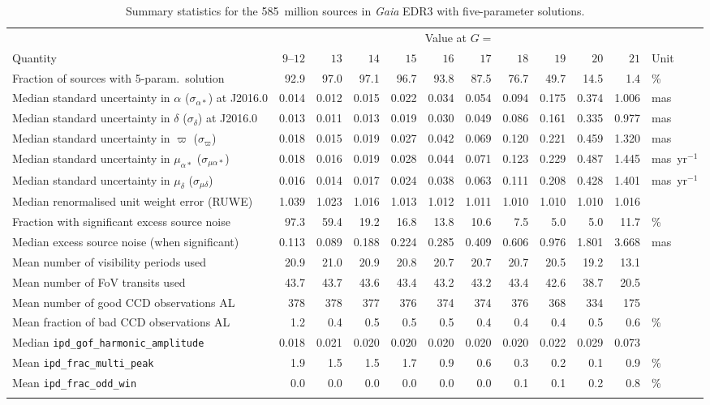 \documentclass[longauth]{aa} %
\newcommand{\gacs}[1]{{\footnotesize\texttt{#1}}}
\begin{document}
\begin{table}[t]
\caption{Summary statistics for the 585~million sources in \textit{Gaia} EDR3 
with five-parameter solutions.
\label{tab:statP5}}
\small   \setlength{\tabcolsep}{4.5pt}
\begin{tabular}{lrrrrrrrrrrl}
\hline\hline
\noalign{\smallskip}
& \multicolumn{10}{c}{Value at $G=$} \\
Quantity & $9$--$12$& $13$ & $14$ & $15$ & $16$ & $17$ & $18$ & $19$ & $20$ & $21$ & Unit \\
\noalign{\smallskip}\hline\noalign{\smallskip}
Fraction of sources with 5-param.\ solution & 92.9& 97.0& 97.1& 96.7& 93.8& 87.5& 76.7& 49.7& 14.5&  1.4& \% \\
Median standard uncertainty in $\alpha$ ($\sigma_{\alpha*}$) at J2016.0 & 0.014& 0.012& 0.015& 0.022& 0.034& 0.054& 0.094& 0.175& 0.374& 1.006& mas \\
Median standard uncertainty in $\delta$ ($\sigma_{\delta}$) at J2016.0 & 0.013& 0.011& 0.013& 0.019& 0.030& 0.049& 0.086& 0.161& 0.335& 0.977& mas \\
Median standard uncertainty in $\varpi$ ($\sigma_{\varpi}$) & 0.018& 0.015& 0.019& 0.027& 0.042& 0.069& 0.120& 0.221& 0.459& 1.320& mas \\
Median standard uncertainty in $\mu_{\alpha*}$ ($\sigma_{\mu\alpha*}$) & 0.018& 0.016& 0.019& 0.028& 0.044& 0.071& 0.123& 0.229& 0.487& 1.445& mas~yr$^{-1}$ \\
Median standard uncertainty in $\mu_{\delta}$ ($\sigma_{\mu\delta}$) & 0.016& 0.014& 0.017& 0.024& 0.038& 0.063& 0.111& 0.208& 0.428& 1.401& mas~yr$^{-1}$ \\
Median renormalised unit weight error (RUWE) & 1.039& 1.023& 1.016& 1.013& 1.012& 1.011& 1.010& 1.010& 1.010& 1.016&   \\
Fraction with significant excess source noise & 97.3& 59.4& 19.2& 16.8& 13.8& 10.6&  7.5&  5.0&  5.0& 11.7& \% \\
Median excess source noise (when significant) & 0.113& 0.089& 0.188& 0.224& 0.285& 0.409& 0.606& 0.976& 1.801& 3.668& mas \\
Mean number of visibility periods used & 20.9& 21.0& 20.9& 20.8& 20.7& 20.7& 20.7& 20.5& 19.2& 13.1&   \\
Mean number of FoV transits used & 43.7& 43.7& 43.6& 43.4& 43.2& 43.2& 43.4& 42.6& 38.7& 20.5&   \\
Mean number of good CCD observations AL & 378& 378& 377& 376& 374& 374& 376& 368& 334& 175&   \\
Mean fraction of bad CCD observations AL &  1.2&  0.4&  0.5&  0.5&  0.5&  0.4&  0.4&  0.4&  0.5&  0.6& \% \\
Median \gacs{ipd\_gof\_harmonic\_amplitude} & 0.018& 0.021& 0.020& 0.020& 0.020& 0.020& 0.020& 0.022& 0.029& 0.073&  \\
Mean \gacs{ipd\_frac\_multi\_peak} &  1.9&  1.5&  1.5&  1.7&  0.9&  0.6&  0.3&  0.2&  0.1&  0.9& \% \\
Mean \gacs{ipd\_frac\_odd\_win} &  0.0&  0.0&  0.0&  0.0&  0.0&  0.0&  0.1&  0.1&  0.2&  0.8& \% \\
\noalign{\smallskip}\hline
\end{tabular}
\end{table}
\end{document}
